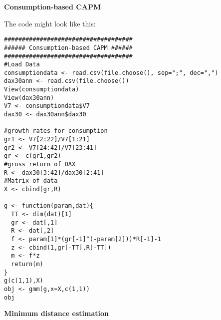 \begin{Solution}{14.8}
\textbf{Consumption-based CAPM}

The code might look like this:
\begin{verbatim}
####################################
###### Consumption-based CAPM ######
####################################
#Load Data
consumptiondata <- read.csv(file.choose(), sep=";", dec=",")
dax30ann <- read.csv(file.choose())
View(consumptiondata)
View(dax30ann)
V7 <- consumptiondata$V7
dax30 <- dax30ann$dax30

#growth rates for consumption
gr1 <- V7[2:22]/V7[1:21]
gr2 <- V7[24:42]/V7[23:41]
gr <- c(gr1,gr2)
#gross return of DAX
R <- dax30[3:42]/dax30[2:41]
#Matrix of data
X <- cbind(gr,R)

g <- function(param,dat){
  TT <- dim(dat)[1]
  gr <- dat[,1]
  R <- dat[,2]
  f <- param[1]*(gr[-1]^(-param[2]))*R[-1]-1
  z <- cbind(1,gr[-TT],R[-TT])
  m <- f*z
  return(m)
}
g(c(1,1),X)
obj <- gmm(g,x=X,c(1,1))
obj
\end{verbatim}
\end{Solution}
\begin{Solution}{14.9}
\textbf{Minimum distance estimation}
\end{Solution}
